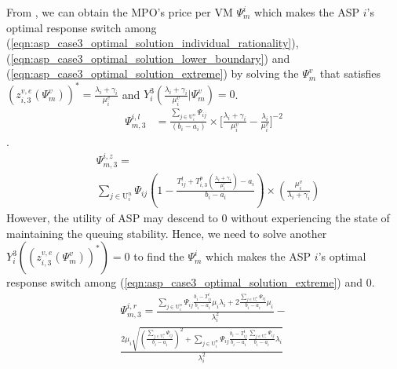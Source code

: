 \documentclass[conference]{IEEEtran}
\begin{document}
From , we can obtain the MPO's price per VM $\Psi_m^i$ which makes the ASP $i$'s optimal response switch among (\ref{eqn:asp_case3_optimal_solution_individual_rationality}), (\ref{eqn:asp_case3_optimal_solution_lower_boundary}) and (\ref{eqn:asp_case3_optimal_solution_extreme}) by solving the $\Psi_m^v$ that satisfies $(z_{i,3}^{v,e}(\Psi_m^v))^* = \frac{\lambda_i+\gamma_i}{\mu_i^v}$ and $Y_i^3(\frac{\lambda_i+\gamma_i}{\mu_i^v}|\Psi_m^v) = 0$.
\begin{equation}
\begin{aligned}
\Psi_{m,3}^{i,l}&= \frac{\sum_{j \in \mathrm{U}_i^n}\Psi_{ij}}{(b_i-a_i)}\times \big[\frac{\lambda_i+\gamma_i}{\mu_i^v} - \frac{\lambda_i}{\mu_i^v}\big]^{-2}
\end{aligned}
\end{equation}.
\begin{equation}
\begin{aligned}
&\Psi_{m,3}^{i,z}= \\
&\sum_{j \in \mathrm{U}_i^n}\Psi_{ij}(1-\frac{T_{ij}^t + T_{i,3}^p(\frac{\lambda_i+\gamma_i}{\mu_i^v})-a_i}{b_i-a_i})\times(\frac{\mu_i^v}{\lambda_i+\gamma_i})
\end{aligned}
\end{equation}
However, the utility of ASP may descend to $0$ without experiencing the state of maintaining the queuing stability. Hence, we need to solve another $Y_i^3((z_{i,3}^{v,e}(\Psi_m^v))^*) = 0$ to find the $\Psi_m^i$ which makes the ASP $i$'s optimal response switch among (\ref{eqn:asp_case3_optimal_solution_extreme}) and $0$. 
\begin{multline}
\Psi_{m,3}^{i,r} = \frac{\sum_{j \in \mathrm{U}_i^n}\Psi_{ij}\frac{b_i-T_{ij}^t }{b_i-a_i}\mu_i\lambda_i+2\frac{\sum_{j \in \mathrm{U}_i^n}\Psi_{ij}}{b_i-a_i}\mu_i}{\lambda_i^2}-\\
\frac{2\mu_i\sqrt{(\frac{\sum_{j \in \mathrm{U}_i^n}\Psi_{ij}}{b_i-a_i})^2+\sum_{j \in \mathrm{U}_i^n}\Psi_{ij}\frac{b_i-T_{ij}^t}{b_i-a_i}\frac{\sum_{j \in \mathrm{U}_i^n}\Psi_{ij}}{b_i-a_i}\lambda_i}}{\lambda_i^2}
\end{multline}
\end{document}

